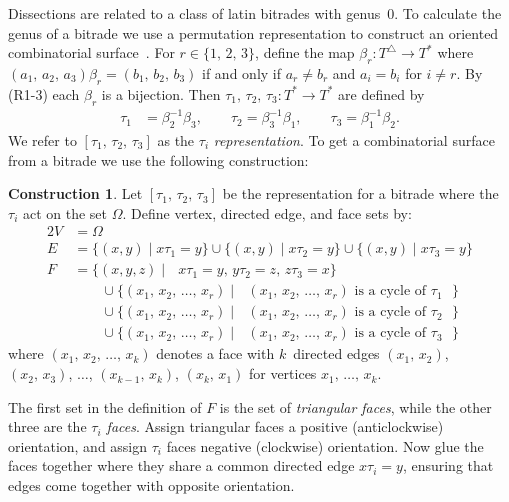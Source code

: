 \documentclass[12pt,amstags,fleqn]{article}
\theoremstyle{plain}
\theoremstyle{definition}
\newtheorem{construction}[theorem]{Construction}
\theoremstyle{definition}
\newcommand{\darts}{\Omega}
\def\ll{{\textstyle \ast}}
\def\rr{{\scriptscriptstyle \triangle}}
\newcommand{\opa}{\ll}
\newcommand{\opb}{\rr}
\begin{document}
Dissections are related to a class of latin bitrades with genus~$0$. To
calculate the genus of a bitrade we use a permutation representation to
construct an oriented combinatorial surface~\cite{Dr9,hamalainen2007,ales-geometrical}.
For $r \in \{1,\, 2,\, 3\}$, define the map 
$\beta_r \colon T^{\opb} \rightarrow
T^{\opa}$ where $(a_1,\, a_2,\, a_3) \beta_r = (b_1,\, b_2,\, b_3)$ if and only if
$a_r \neq b_r$
and $a_i = b_i$ for $i \neq r$.
By (R1-3)
each $\beta_r$ is a bijection.
Then
$\tau_1,\, \tau_2,\, \tau_3\colon T^{\opa} \rightarrow
T^{\opa}$ are defined by
\begin{align}
\tau_1 &= \beta_2^{-1}\beta_3, \qquad
\tau_2 = \beta_3^{-1}\beta_1, \qquad
\tau_3 = \beta_1^{-1}\beta_2. \label{eqnTau}
\end{align}
We refer to
$[\tau_1,\, \tau_2,\, \tau_3]$
as the $\tau_i$ {\em representation}. To get a combinatorial surface
from a bitrade we use the following construction:

\begin{construction}\label{constructionTauiSurface}
Let $[\tau_1,\, \tau_2,\, \tau_3]$ be the representation for 
a bitrade where the $\tau_i$ act on
the set $\darts$. Define
vertex, directed edge, and face sets by:
\begin{alignat*}{2}
V &= \darts \\
E &= \{ (x,y) \mid x \tau_1 = y \} \cup \{ (x,y) \mid x \tau_2 = y \} \cup \{ (x,y) \mid x \tau_3 = y \} \\
F &= \{ (x,y,z) \mid \text{ $x \tau_1 = y$, $y \tau_2 = z$, $z \tau_3 = x$} \} \\
  & \qquad \cup \{ (x_1,\, x_2,\, \dots,\, x_r) \mid \text{ $(x_1,\,
x_2,\, \dots,\, x_r)$ is a cycle of $\tau_1$ } \} \\
  & \qquad \cup \{ (x_1,\, x_2,\, \dots,\, x_r) \mid \text{ $(x_1,\,
x_2,\, \dots,\, x_r)$ is a cycle of $\tau_2$ } \} \\
  & \qquad \cup \{ (x_1,\, x_2,\, \dots,\, x_r) \mid \text{ $(x_1,\,
x_2,\, \dots,\, x_r)$ is a cycle of $\tau_3$ } \}
\end{alignat*}
where $(x_1,\, x_2,\, \dots,\, x_k)$ denotes a face with $k$~directed edges
$(x_1,\, x_2)$, $(x_2,\, x_3)$, $\dots$,
$(x_{k-1},\, x_k)$, $(x_k,\, x_1)$ for vertices
$x_1,\, \dots,\, x_k$.

The first set in the definition of $F$ is the set of {\em triangular
faces}, while the other three are the {\em $\tau_i$ faces}.
Assign triangular faces a positive (anticlockwise) orientation, and
assign
$\tau_i$ faces negative (clockwise) orientation. Now glue the faces
together where they share a common directed edge $x \tau_i = y$,
ensuring that edges come together with opposite orientation.
\end{construction}
\end{document}
